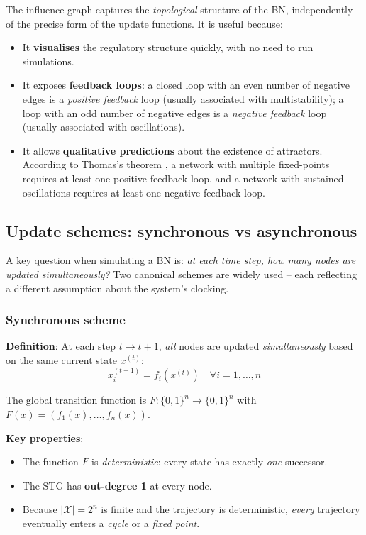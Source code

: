 \documentclass[oneside,final]{hcmut-report}
\begin{document}
The influence graph captures the \textit{topological} structure of the BN, independently of the precise form of the update functions. It is useful because:
\begin{itemize}[leftmargin=*]
    \item It \textbf{visualises} the regulatory structure quickly, with no need to run simulations.
    \item It exposes \textbf{feedback loops}: a closed loop with an even number of negative edges is a \textit{positive feedback} loop (usually associated with multistability); a loop with an odd number of negative edges is a \textit{negative feedback} loop (usually associated with oscillations).
    \item It allows \textbf{qualitative predictions} about the existence of attractors. According to Thomas's theorem \cite{thomas1981}, a network with multiple fixed-points requires at least one positive feedback loop, and a network with sustained oscillations requires at least one negative feedback loop.
\end{itemize}

\subsection{Update schemes: synchronous vs asynchronous}\label{subsec:update-schemes}

A key question when simulating a BN is: \textit{at each time step, how many nodes are updated simultaneously?} Two canonical schemes are widely used -- each reflecting a different assumption about the system's clocking.

\subsubsection{Synchronous scheme}

\textbf{Definition}: At each step $t \to t+1$, \textit{all} nodes are updated \textit{simultaneously} based on the same current state $x^{(t)}$:
$$x_i^{(t+1)} = f_i(x^{(t)}) \quad \forall i = 1, \ldots, n$$

The global transition function is $F : \{0,1\}^n \to \{0,1\}^n$ with $F(x) = (f_1(x), \ldots, f_n(x))$.

\textbf{Key properties}:
\begin{itemize}[leftmargin=*]
    \item The function $F$ is \textit{deterministic}: every state has exactly \textit{one} successor.
    \item The STG has \textbf{out-degree 1} at every node.
    \item Because $|\mathcal{X}| = 2^n$ is finite and the trajectory is deterministic, \textit{every} trajectory eventually enters a \textit{cycle} or a \textit{fixed point}.
\end{itemize}
\end{document}
